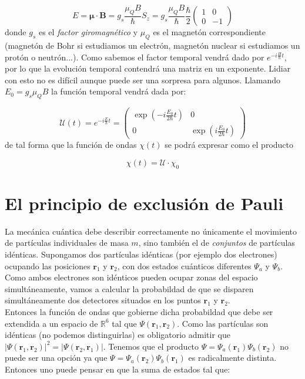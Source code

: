 \documentclass[12pt,a4paper]{article}
\numberwithin{equation}{section}
\numberwithin{figure}{section}
\newcommand{\rn}{\mathbf{r}}
\newcommand{\nmu}{\boldsymbol{\mu}}
\newcommand{\Bn}{\mathbf{B}}
\begin{document}
\begin{equation}
E = \nmu \cdot \Bn = g_s \dfrac{\mu_Q
 B}{\hbar} S_z = g_s \dfrac{\mu_Q B}{\hbar} \dfrac{\hbar}{2}  \begin{pmatrix}
 1 & 0 \\
 0 & -1 
 \end{pmatrix}
\end{equation}
donde $g_s$ es el \textit{factor giromagnético} y $\mu_Q$ es el magnetón correspondiente (magnetón de Bohr si estudiamos un electrón, magnetón nuclear si estudiamos un protón o neutrón...). Como sabemos el factor temporal vendrá dado por $e^{-i \frac{H}{\hbar} t}$, por lo que la evolución temporal contendrá una matriz en un exponente. Lidiar con esto no es difícil aunque puede ser una sorpresa para algunos. Llamando $E_0=g_s \mu_Q B$ la función temporal vendrá dada por:

\begin{equation} \mathcal{U} (t) = e^{- i \frac{E}{\hbar} t} = \begin{pmatrix}
\exp(- i \frac{E_0}{2\hbar} t ) & 0 \\
0 &  \exp (i \frac{E_0}{2\hbar} t)
\end{pmatrix} \end{equation}
de tal forma que la función de ondas $\chi (t)$ se podrá expresar como el producto 

\begin{equation}
\chi (t) = \mathcal{U} \cdot \chi_0
\end{equation}

\section{El principio de exclusión de Pauli}

La mecánica cuántica debe describir correctamente no únicamente el movimiento de partículas individuales de masa $m$, sino también el de \textit{conjuntos} de partículas idénticas. Supongamos dos partículas idénticas (por ejemplo dos electrones) ocupando las posiciones $\rn_1$ y $\rn_2$, con dos estados cuánticos diferentes $\Psi_a$ y $\Psi_b$. Como ambos electrones son idénticos pueden ocupar zonas del espacio simultáneamente, vamos a calcular la probabildad de que se disparen simultáneamente dos detectores situados en los puntos $\rn_1$ y $\rn_2$. \\
    
Entonces la función de ondas que gobierne dicha probabildad que debe ser extendida a un espacio de $\mathbb{R}^6$ tal que $\Psi (\rn_1, \rn_2)$. Como las partículas son idénticas (no podemos distinguirlas) es obligatorio admitir que $| \Psi (\rn_1,\rn_2) |^2 = | \Psi (\rn_2,\rn_1) |$. Tenemos que el producto $\Psi = \Psi_a (\rn_1) \Psi_b (\rn_2)$ no puede ser una opción ya que $\Psi = \Psi_a (\rn_2) \Psi_b (\rn_1)$ es radicalmente distinta. Entonces uno puede pensar en que la suma de estados tal que:
\end{document}
